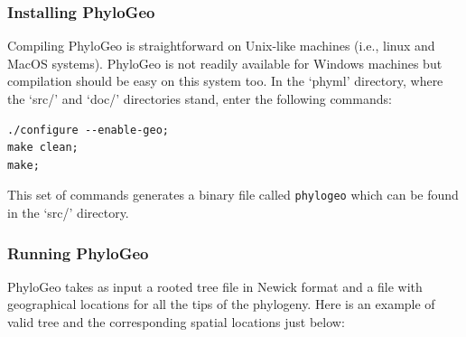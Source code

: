 \documentclass[a4paper,12pt]{article}
\newcommand{\x}[1]{\texttt{#1}}
\begin{document}
\subsubsection{Installing PhyloGeo}

Compiling PhyloGeo is straightforward on Unix-like  machines (i.e., linux and MacOS systems). PhyloGeo
is not readily available for Windows machines but  compilation should be easy on this system too. In
the `phyml' directory, where the `src/'  and `doc/' directories stand, enter the following commands:
{\setlength{\baselineskip}{0.5\baselineskip}
\begin{verbatim}
./configure --enable-geo;
make clean;
make;
\end{verbatim} } This set of commands generates  a binary file called \x{phylogeo} which can be found
  in the `src/' directory.

\subsubsection{Running PhyloGeo} PhyloGeo takes as input a rooted tree file in Newick format and a file
with geographical locations for all the tips of the phylogeny. Here is an example of valid tree and
the corresponding spatial locations just below:
\end{document}

